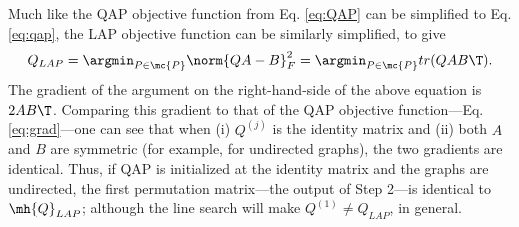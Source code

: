 \documentclass[10pt,journal,cspaper,compsoc]{IEEEtran}
\newcommand{\PmcP}{P \in \mc{P}}
\begin{document}
Much like the QAP objective function from Eq. \eqref{eq:QAP} can be simplified to Eq. \eqref{eq:qap}, the LAP objective function can be similarly simplified, to give
\begin{align}
	Q_{LAP}= \argmin_{\PmcP} \norm{QA-B}_F^2 = \argmin_{\PmcP} tr(QA B\T).
\end{align}
The gradient of the argument on the right-hand-side of the above equation is $2AB\T$.
Comparing this gradient to that of the QAP objective function---Eq. \eqref{eq:grad}---one can see that when (i) $Q^{(j)}$ is the identity matrix and (ii) both $A$ and $B$ are symmetric (for example, for undirected graphs), the two gradients are identical.  Thus, if QAP is initialized at the identity matrix and the graphs are undirected, the first permutation matrix---the output of Step 2---is identical to $\mh{Q}_{LAP}$; although the line search will make $Q^{(1)} \neq Q_{LAP}$, in general.  %

\end{document}
